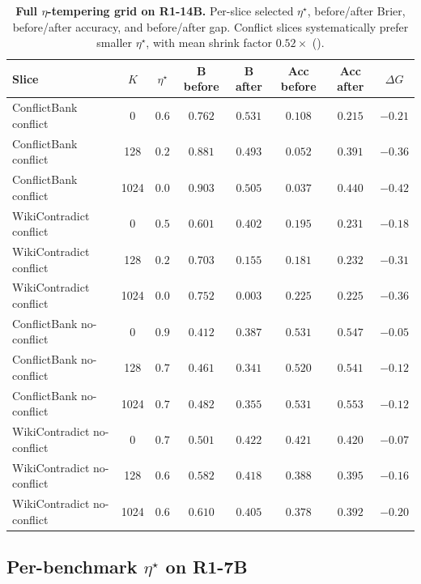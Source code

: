 \begin{table}[H]
\centering\small
\caption{\textbf{Full $\eta$-tempering grid on R1-14B.}  Per-slice
selected $\eta^\star$, before/after Brier, before/after accuracy, and
before/after gap.  Conflict slices systematically prefer smaller
$\eta^\star$, with mean shrink factor $0.52\!\times$
().}
\label{tab:full-eta-grid}
\setlength{\tabcolsep}{3pt}
\begin{tabular}{lccccccc}
\toprule
\textbf{Slice} & $K$ & $\eta^\star$ & B before & B after & Acc before & Acc after & $\Delta G$\\
\midrule
ConflictBank conflict        & 0    & $0.6$ & $0.762$ & $0.531$ & $0.108$ & $0.215$ & $-0.21$\\
ConflictBank conflict        & 128  & $0.2$ & $0.881$ & $0.493$ & $0.052$ & $0.391$ & $-0.36$\\
ConflictBank conflict        & 1024 & $0.0$ & $0.903$ & $\mathbf{0.505}$ & $0.037$ & $\mathbf{0.440}$ & $-0.42$\\
\midrule
WikiContradict conflict       & 0    & $0.5$ & $0.601$ & $0.402$ & $0.195$ & $0.231$ & $-0.18$\\
WikiContradict conflict       & 128  & $0.2$ & $0.703$ & $0.155$ & $0.181$ & $0.232$ & $-0.31$\\
WikiContradict conflict       & 1024 & $0.0$ & $0.752$ & $\mathbf{0.003}$ & $0.225$ & $0.225$ & $-0.36$\\
\midrule
ConflictBank no-conflict      & 0    & $0.9$ & $0.412$ & $0.387$ & $0.531$ & $0.547$ & $-0.05$\\
ConflictBank no-conflict      & 128  & $0.7$ & $0.461$ & $0.341$ & $0.520$ & $0.541$ & $-0.12$\\
ConflictBank no-conflict      & 1024 & $0.7$ & $0.482$ & $\mathbf{0.355}$ & $0.531$ & $\mathbf{0.553}$ & $-0.12$\\
\midrule
WikiContradict no-conflict    & 0    & $0.7$ & $0.501$ & $0.422$ & $0.421$ & $0.420$ & $-0.07$\\
WikiContradict no-conflict    & 128  & $0.6$ & $0.582$ & $0.418$ & $0.388$ & $0.395$ & $-0.16$\\
WikiContradict no-conflict    & 1024 & $0.6$ & $0.610$ & $\mathbf{0.405}$ & $0.378$ & $\mathbf{0.392}$ & $-0.20$\\
\bottomrule
\end{tabular}
\end{table}




\subsection{Per-benchmark $\eta^\star$ on R1-7B}
\label{app:eta-r1-7b}


